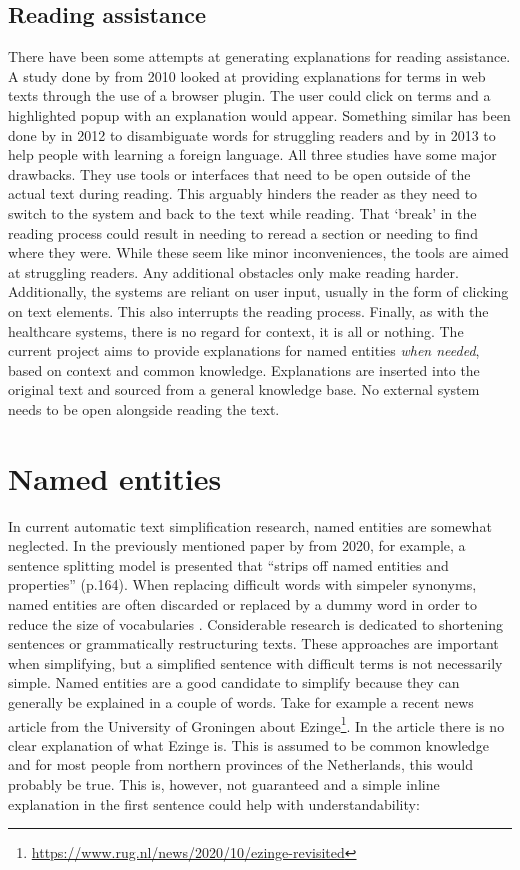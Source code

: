 \documentclass[
10pt, %
a4paper, %
oneside, %
headinclude,footinclude, %
] {book}%
\begin{document}
\subsection{Reading assistance}
There have been some attempts at generating explanations for reading assistance.
A study done by \citeauthor{watanabe2010} from 2010 looked at providing explanations for terms in web texts through the use of a browser plugin.
The user could click on terms and a highlighted popup with an explanation would appear.
Something similar has been done by \citeauthor{eom2012} in 2012 to disambiguate words for struggling readers and by \citeauthor{azab2013} in 2013 to help people with learning a foreign language.
All three studies have some major drawbacks.
They use tools or interfaces that need to be open outside of the actual text during reading.
This arguably hinders the reader as they need to switch to the system and back to the text while reading.
That `break' in the reading process could result in needing to reread a section or needing to find where they were.
While these seem like minor inconveniences, the tools are aimed at struggling readers.
Any additional obstacles only make reading harder.
Additionally, the systems are reliant on user input, usually in the form of clicking on text elements.
This also interrupts the reading process.
Finally, as with the healthcare systems, there is no regard for context, it is all or nothing.
The current project aims to provide explanations for named entities \textit{when needed}, based on context and common knowledge.
Explanations are inserted into the original text and sourced from a general knowledge base.
No external system needs to be open alongside reading the text.

\section{Named entities}
In current automatic text simplification research, named entities are somewhat neglected.
In the previously mentioned paper by \citeauthor{alva2020} from 2020, for example, a sentence splitting model is presented that ``strips off named entities and properties'' (p.164).
When replacing difficult words with simpeler synonyms, named entities are often discarded or replaced by a dummy word in order to reduce the size of vocabularies \citep{nisioi2017,alva2020}.
Considerable research is dedicated to shortening sentences or grammatically restructuring texts.
These approaches are important when simplifying, but a simplified sentence with difficult terms is not necessarily simple.
Named entities are a good candidate to simplify because they can generally be explained in a couple of words.
Take for example a recent news article from the University of Groningen about Ezinge\footnote{\url{https://www.rug.nl/news/2020/10/ezinge-revisited}}.
In the article there is no clear explanation of what Ezinge is.
This is assumed to be common knowledge and for most people from northern provinces of the Netherlands, this would probably be true.
This is, however, not guaranteed and a simple inline explanation in the first sentence could help with understandability:
\end{document}
